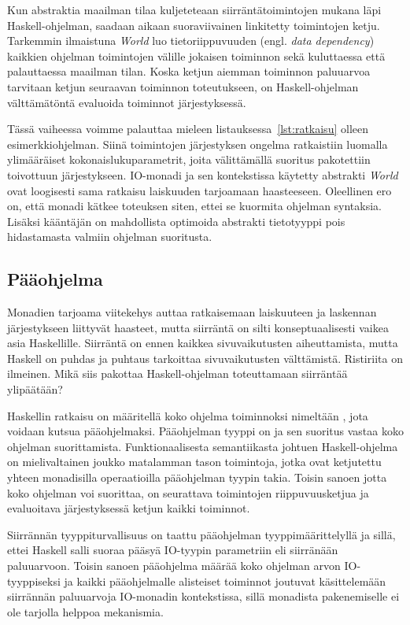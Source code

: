 \documentclass[finnish]{tktltiki2}
\begin{document}
Kun abstraktia maailman tilaa kuljeteteaan siirräntätoimintojen mukana läpi Haskell-ohjelman,
saadaan aikaan suoraviivainen linkitetty toimintojen ketju. Tarkemmin ilmaistuna \emph{World} luo
tietoriippuvuuden (engl. \emph{data dependency}) kaikkien ohjelman toimintojen välille jokaisen
toiminnon sekä kuluttaessa että palauttaessa maailman tilan. Koska ketjun aiemman toiminnon
paluuarvoa tarvitaan ketjun seuraavan toiminnon toteutukseen, on Haskell-ohjelman välttämätöntä
evaluoida toiminnot järjestyksessä.

Tässä vaiheessa voimme palauttaa mieleen listauksessa~\ref{lst:ratkaisu} olleen esimerkkiohjelman.
Siinä toimintojen järjestyksen ongelma ratkaistiin luomalla ylimääräiset kokonaislukuparametrit,
joita välittämällä suoritus pakotettiin toivottuun järjestykseen. IO-monadi ja sen kontekstissa
käytetty abstrakti \emph{World} ovat loogisesti sama ratkaisu laiskuuden tarjoamaan haasteeseen.
Oleellinen ero on, että monadi kätkee toteuksen siten, ettei se kuormita ohjelman syntaksia. Lisäksi
kääntäjän on mahdollista optimoida abstrakti tietotyyppi pois hidastamasta valmiin ohjelman
suoritusta.

\subsection{Pääohjelma}

Monadien tarjoama viitekehys auttaa ratkaisemaan laiskuuteen ja laskennan järjestykseen liittyvät
haasteet, mutta siirräntä on silti konseptuaalisesti vaikea asia Haskellille. Siirräntä on ennen
kaikkea sivuvaikutusten aiheuttamista, mutta Haskell on puhdas ja puhtaus tarkoittaa sivuvaikutusten
välttämistä. Ristiriita on ilmeinen. Mikä siis pakottaa Haskell-ohjelman toteuttamaan siirräntää
ylipäätään?

Haskellin ratkaisu on määritellä koko ohjelma toiminnoksi nimeltään , jota voidaan kutsua
pääohjelmaksi. Pääohjelman tyyppi on  ja sen suoritus vastaa koko ohjelman
suorittamista. Funktionaalisesta semantiikasta johtuen Haskell-ohjelma on mielivaltainen joukko
matalamman tason toimintoja, jotka ovat ketjutettu yhteen monadisilla operaatioilla pääohjelman
tyypin takia. Toisin sanoen jotta koko ohjelman voi suorittaa, on seurattava toimintojen
riippuvuusketjua ja evaluoitava järjestyksessä ketjun kaikki toiminnot.

Siirrännän tyyppiturvallisuus on taattu pääohjelman tyyppimäärittelyllä ja sillä, ettei Haskell
salli suoraa pääsyä IO-tyypin parametriin eli siirränään paluuarvoon. Toisin sanoen pääohjelma
määrää koko ohjelman arvon IO-tyyppiseksi ja kaikki pääohjelmalle alisteiset toiminnot joutuvat
käsittelemään siirrännän paluuarvoja IO-monadin kontekstissa, sillä monadista pakenemiselle ei ole
tarjolla helppoa mekanismia.
\end{document}
